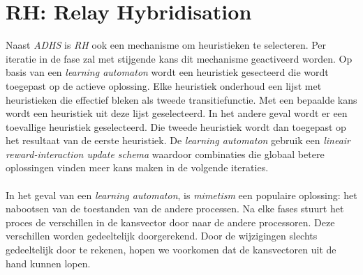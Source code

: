 \section{RH: Relay Hybridisation}
Naast \emph{ADHS} is \emph{RH} ook een mechanisme om heuristieken te selecteren. Per iteratie in de fase zal met stijgende kans dit mechanisme geactiveerd worden. Op basis van een \emph{learning automaton} wordt een heuristiek gesecteerd die wordt toegepast op de actieve oplossing. Elke heuristiek onderhoud een lijst met heuristieken die effectief bleken als tweede transitiefunctie. Met een bepaalde kans wordt een heuristiek uit deze lijst geselecteerd. In het andere geval wordt er een toevallige heuristiek geselecteerd. Die tweede heuristiek wordt dan toegepast op het resultaat van de eerste heuristiek. De \emph{learning automaton} gebruik een \emph{lineair reward-interaction update schema} waardoor combinaties die globaal betere oplossingen vinden meer kans maken in de volgende iteraties.

\paragraph{}
In het geval van een \emph{learning automaton}, is \emph{mimetism} een populaire oplossing: het nabootsen van de toestanden van de andere processen. Na elke fases stuurt het proces de verschillen in de kansvector door naar de andere processoren. Deze verschillen worden gedeeltelijk doorgerekend. Door de wijzigingen slechts gedeeltelijk door te rekenen, hopen we voorkomen dat de kansvectoren uit de hand kunnen lopen.